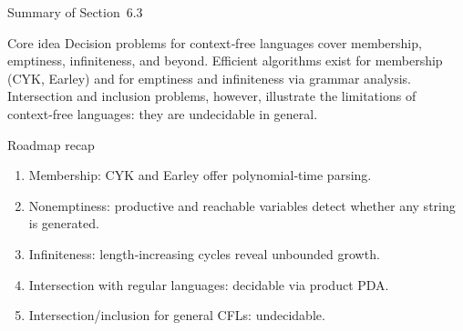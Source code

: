 \begin{frame}[t]{Summary of Section 6.3}
  \begin{tblock}{Core idea}
    Decision problems for context‑free languages cover membership,
    emptiness, infiniteness, and beyond.  Efficient algorithms exist
    for membership (CYK, Earley) and for emptiness and infiniteness via
    grammar analysis.  Intersection and inclusion problems, however,
    illustrate the limitations of context‑free languages: they are
    undecidable in general.
  \end{tblock}
  \begin{tblock}{Roadmap recap}
    \begin{enumerate}
      \item Membership: CYK and Earley offer polynomial‑time parsing.
      \item Nonemptiness: productive and reachable variables detect
        whether any string is generated.
      \item Infiniteness: length‑increasing cycles reveal unbounded
        growth.
      \item Intersection with regular languages: decidable via
        product PDA.
      \item Intersection/inclusion for general CFLs: undecidable.
    \end{enumerate}
  \end{tblock}
  \label{fr:6.3-17}
\end{frame}